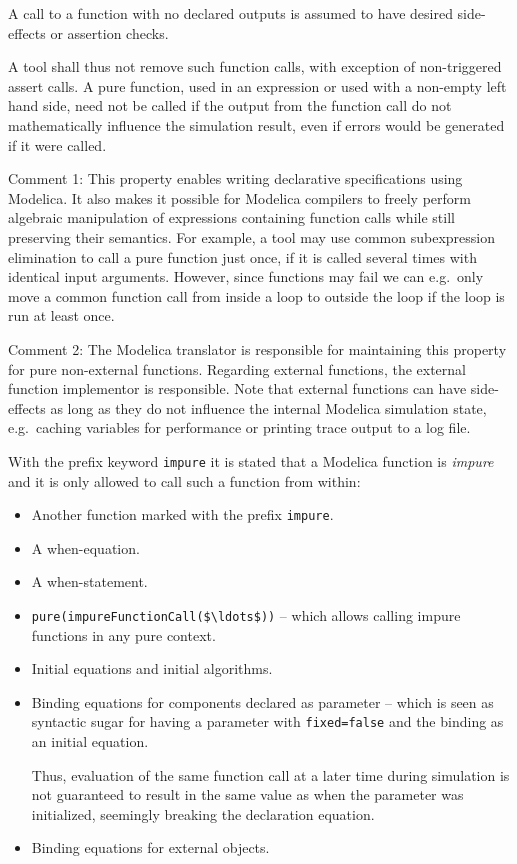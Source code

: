 A call to a function with no declared outputs is assumed to have desired
side-effects or assertion checks.

\begin{nonnormative}
A tool shall thus not remove such function calls, with exception of non-triggered assert calls.  A pure function, used in an expression or used with
a non-empty left hand side, need not be called if the output from the function call do not mathematically influence the simulation result, even if
errors would be generated if it were called.
\end{nonnormative}

\begin{nonnormative}
Comment 1: This property enables writing declarative
specifications using Modelica. It also makes it possible for Modelica
compilers to freely perform algebraic manipulation of expressions
containing function calls while still preserving their semantics. For
example, a tool may use common subexpression elimination to call a pure
function just once, if it is called several times with identical input
arguments. However, since functions may fail we can e.g.\ only move a
common function call from inside a loop to outside the loop if the loop
is run at least once.
\end{nonnormative}

\begin{nonnormative}
Comment 2: The Modelica translator is responsible for
maintaining this property for pure non-external functions. Regarding
external functions, the external function implementor is responsible.
Note that external functions can have side-effects as long as they do
not influence the internal Modelica simulation state, e.g.\ caching
variables for performance or printing trace output to a log file.
\end{nonnormative}

With the prefix keyword \lstinline!impure! it is stated that a Modelica
function is \emph{impure} and it is only allowed to call such a function
from within:
\begin{itemize}
\item
  Another function marked with the prefix \lstinline!impure!.
\item
  A when-equation.
\item
  A when-statement.
\item
  \lstinline!pure(impureFunctionCall($\ldots$))! -- which allows calling impure functions in any pure context.
\item
  Initial equations and initial algorithms.
\item
  Binding equations for components declared as parameter -- which is seen as syntactic sugar for having a parameter with \lstinline!fixed=false! and the binding as an initial equation.
  \begin{nonnormative}
  Thus, evaluation of the same function call at a later time during simulation is not guaranteed to result in the same value as when the parameter
  was initialized, seemingly breaking the declaration equation.
  \end{nonnormative}
\item
  Binding equations for external objects.
\end{itemize}


